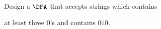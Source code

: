   Design a $\DFA$ that accepts strings which contains
  \begin{itemize}
    \li at least three $0$'s and
    \li contains $010$.
  \end{itemize}
